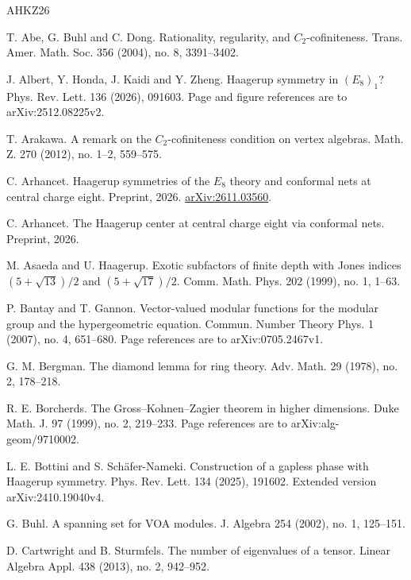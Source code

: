 \documentclass[leqno]{article}
\numberwithin{equation}{section}
\begin{document}
\begin{thebibliography}{AHKZ26}

T. Abe, G. Buhl and C. Dong.
\newblock Rationality, regularity, and $C_2$-cofiniteness.
\newblock Trans. Amer. Math. Soc. 356 (2004), no. 8, 3391--3402.

J. Albert, Y. Honda, J. Kaidi and Y. Zheng.
\newblock Haagerup symmetry in $(E_8)_1$?
\newblock Phys. Rev. Lett. 136 (2026), 091603. Page and figure references are to arXiv:2512.08225v2.

T. Arakawa.
\newblock A remark on the $C_2$-cofiniteness condition on vertex algebras.
\newblock Math. Z. 270 (2012), no. 1--2, 559--575.

C. Arhancet.
\newblock Haagerup symmetries of the $E_8$ theory and conformal nets at central charge eight.
\newblock Preprint, 2026. \href{https://arxiv.org/abs/2611.03560}{arXiv:2611.03560}.

C. Arhancet.
\newblock The Haagerup center at central charge eight via conformal nets.
\newblock Preprint, 2026.

M. Asaeda and U. Haagerup.
\newblock Exotic subfactors of finite depth with Jones indices $(5+\sqrt{13})/2$ and $(5+\sqrt{17})/2$.
\newblock Comm. Math. Phys. 202 (1999), no. 1, 1--63.

P. Bantay and T. Gannon.
\newblock Vector-valued modular functions for the modular group and the hypergeometric equation.
\newblock Commun. Number Theory Phys. 1 (2007), no. 4, 651--680. Page references are to arXiv:0705.2467v1.

G. M. Bergman.
\newblock The diamond lemma for ring theory.
\newblock Adv. Math. 29 (1978), no. 2, 178--218.

R. E. Borcherds.
\newblock The Gross--Kohnen--Zagier theorem in higher dimensions.
\newblock Duke Math. J. 97 (1999), no. 2, 219--233. Page references are to arXiv:alg-geom/9710002.

L. E. Bottini and S. Schäfer-Nameki.
\newblock Construction of a gapless phase with Haagerup symmetry.
\newblock Phys. Rev. Lett. 134 (2025), 191602. Extended version arXiv:2410.19040v4.

G. Buhl.
\newblock A spanning set for VOA modules.
\newblock J. Algebra 254 (2002), no. 1, 125--151.

D. Cartwright and B. Sturmfels.
\newblock The number of eigenvalues of a tensor.
\newblock Linear Algebra Appl. 438 (2013), no. 2, 942--952.


\end{thebibliography}
\end{document}
